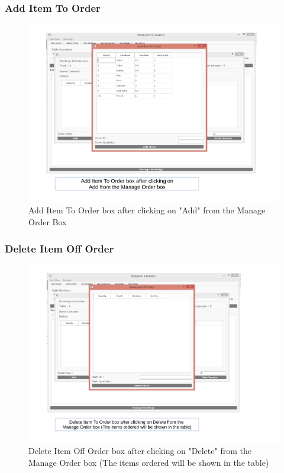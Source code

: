 \begin{landscape}
\subsubsection{Add Item To Order}
\begin{figure}[H]
    \includegraphics[width = 15cm]{./Maintenance/images/screen11}
    \caption{Add Item To Order box after clicking on "Add" from the Manage Order Box} \label{fig:screen11}
\end{figure}

\subsubsection{Delete Item Off Order}
\begin{figure}[H]
    \includegraphics[width = 15cm]{./Maintenance/images/screen12}
    \caption{Delete Item Off Order box after clicking on "Delete" from the Manage Order box (The items ordered will be shown in the table)} \label{fig:screen12}
\end{figure}


\end{landscape}
